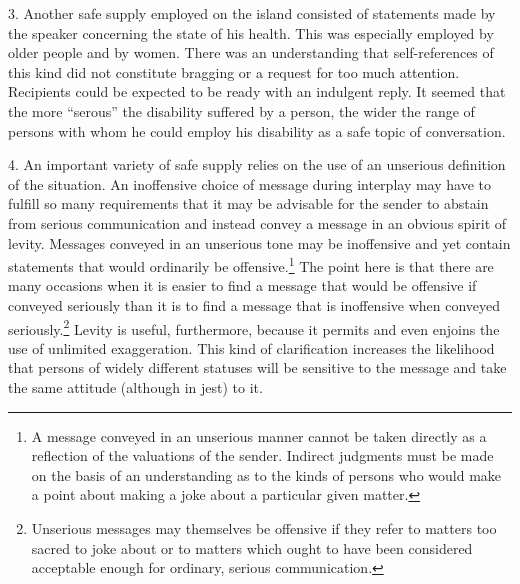 \documentclass[twoside,symmetric,nobib,justified]{tufte-book}
\begin{document}
3. Another safe supply employed on the island consisted of statements
made by the speaker concerning the state of his health. This was
especially employed by older people and by women. There was an
understanding that self-references of this kind did not constitute
bragging or a request for too much attention. Recipients could be
expected to be ready with an indulgent reply. It seemed that the more
``serous'' the disability suffered by a person, the wider the range of
persons with whom he could employ his disability as a safe topic of
conversation.

4. An important variety of safe supply relies on the use of an unserious
definition of the situation. An inoffensive choice of message during
interplay may have to fulfill so many requirements that it may be
advisable for the sender to abstain from serious communication and
instead convey a message in an obvious spirit of levity. Messages
conveyed in an unserious tone may be inoffensive and yet contain
statements that would ordinarily be offensive.\footnote{A message
  conveyed in an unserious manner cannot be taken directly as a
  reflection of the valuations of the sender. Indirect judgments must be
  made on the basis of an understanding as to the kinds of persons who
  would make a point about making a joke about a particular given
  matter.} The point here is that there are many occasions when it is
easier to find a message that would be offensive if conveyed seriously
than it is to find a message that is inoffensive when conveyed
seriously.\footnote{Unserious messages may themselves be offensive if
  they refer to matters too sacred to joke about or to matters which
  ought to have been considered acceptable enough for ordinary, serious
  communication.} Levity is useful, furthermore, because it permits and
even enjoins the use of unlimited exaggeration. This kind of
clarification increases the likelihood that persons of widely different
statuses will be sensitive to the message and take the same attitude
(although in jest) to it.
\end{document}
